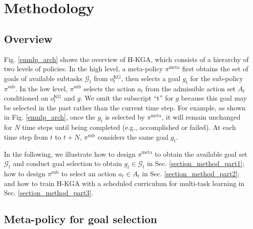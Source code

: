\documentclass[11pt]{article}
\begin{document}
\section{Methodology}

\subsection{Overview}

Fig. \ref{emnlp_arch} shows the overview of H-KGA, which consists of a hierarchy of two levels of policies.  
In the high level, a meta-policy $\pi^{\text{meta}}$ first obtains the set of goals of  available subtasks $\mathcal{G}_t$ from $o_t^{\text{KG}}$, then selects a goal $g_t$ for the sub-policy $\pi^{\text{sub}}$.
In the low level, $\pi^{\text{sub}}$ selects the action $a_t$ from the admissible action set $A_t$ conditioned on $o_t^{\text{KG}}$ and $g$. We omit the subscript ``t'' for $g$ because this goal may be selected in the past rather than the current time step. For example, as shown in Fig. \ref{emnlp_arch}, once the $g_t$ is selected by $\pi^{\text{meta}}$, it will remain unchanged for $N$ time steps until being completed (e.g., accomplished or failed). At each time step from $t$ to $t+N$, $\pi^{\text{sub}}$ considers the same goal $g_t$. 

In the following, we illustrate how to design $\pi^{\text{meta}}$ to obtain the available goal set $\mathcal{G}_t$ and conduct goal selection to obtain $g_t \in \mathcal{G}_t$ in Sec. \ref{section_method_part1}; how to design $\pi^{\text{sub}}$ to select an action $a_t \in A_t$ in Sec. \ref{section_method_part2}; 
and how to train H-KGA with a scheduled curriculum for multi-task learning in Sec. \ref{section_method_part3}. 

\subsection{Meta-policy for goal selection \label{section_method_part1}}
\end{document}
